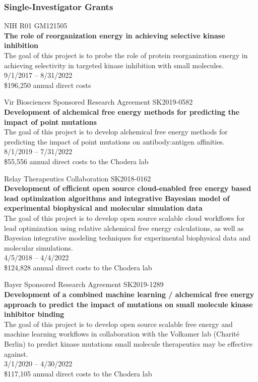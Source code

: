 \documentclass[10pt]{article}
\begin{document}
\subsubsection*{Single-Investigator Grants}


NIH R01 GM121505 \\
{\bf The role of reorganization energy in achieving selective kinase inhibition} \\
The goal of this project is to probe the role of protein reorganization energy in achieving selectivity in targeted kinase inhibition with small molecules. \\
9/1/2017 -- 8/31/2022 \\
\$196,250 annual direct costs

\vspace{1.5ex}

Vir Biosciences Sponsored Research Agreement SK2019-0582 \\
{\bf Development of alchemical free energy methods for predicting the impact of point mutations}\\
The goal of this project is to develop alchemical free energy methods for predicting the impact of point mutations on antibody:antigen affinities.\\
8/1/2019 -- 7/31/2022\\
\$55,556 annual direct costs to the Chodera lab

\vspace{1.5ex}

Relay Therapeutics Collaboration SK2018-0162\\
{\bf Development of efficient open source cloud-enabled free energy based lead optimization algorithms and integrative Bayesian model of experimental biophysical and molecular simulation data} \\
The goal of this project is to develop open source scalable cloud workflows for lead optimization using relative alchemical free energy calculations, as well as Bayesian integrative modeling techniques for experimental biophysical data and molecular simulations. \\
4/5/2018 -- 4/4/2022 \\
\$124,828 annual direct costs to the Chodera lab

\vspace{1.5ex}

Bayer Sponsored Research Agreement SK2019-1289 \\
{\bf Development of a combined machine learning / alchemical free energy approach to predict the impact of mutations on small molecule kinase inhibitor binding} \\
The goal of this project is to develop open source scalable free energy and machine learning workflows in collaboration with the Volkamer lab (Charit\'{e} Berlin) to predict kinase mutations small molecule therapeutics may be effective against. \\
3/1/2020 -- 4/30/2022 \\
\$117,105 annual direct costs to the Chodera lab
\end{document}
